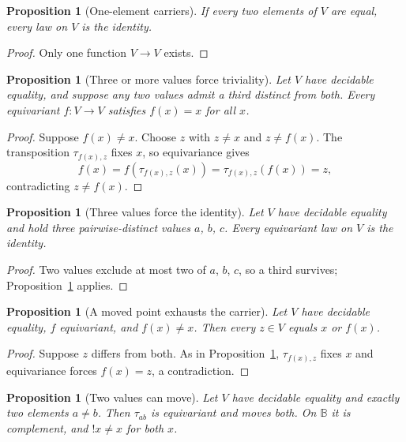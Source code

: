 \documentclass[11pt]{article}
\newtheorem{proposition}[theorem]{Proposition}
\newcommand{\B}{\mathbb{B}}
\begin{document}
\begin{proposition}[One-element carriers]
\label{prop:one}
If every two elements of $V$ are equal, every law on $V$ is the identity.
\end{proposition}

\begin{proof}
Only one function $V \to V$ exists.
\end{proof}

\begin{proposition}[Three or more values force triviality]
\label{prop:three}
Let $V$ have decidable equality, and suppose any two values admit a third distinct from both. Every equivariant $f : V \to V$ satisfies $f(x) = x$ for all $x$.
\end{proposition}

\begin{proof}
Suppose $f(x) \neq x$. Choose $z$ with $z \neq x$ and $z \neq f(x)$. The transposition $\tau_{f(x),z}$ fixes $x$, so equivariance gives
\[
f(x) = f(\tau_{f(x),z}(x)) = \tau_{f(x),z}(f(x)) = z,
\]
contradicting $z \neq f(x)$.
\end{proof}

\begin{proposition}[Three values force the identity]
\label{prop:threestill}
Let $V$ have decidable equality and hold three pairwise-distinct values $a$, $b$, $c$. Every equivariant law on $V$ is the identity.
\end{proposition}

\begin{proof}
Two values exclude at most two of $a$, $b$, $c$, so a third survives; Proposition~\ref{prop:three} applies.
\end{proof}

\begin{proposition}[A moved point exhausts the carrier]
\label{prop:twoatmost}
Let $V$ have decidable equality, $f$ equivariant, and $f(x) \neq x$. Then every $z \in V$ equals $x$ or $f(x)$.
\end{proposition}

\begin{proof}
Suppose $z$ differs from both. As in Proposition~\ref{prop:three}, $\tau_{f(x),z}$ fixes $x$ and equivariance forces $f(x) = z$, a contradiction.
\end{proof}

\begin{proposition}[Two values can move]
\label{prop:two}
Let $V$ have decidable equality and exactly two elements $a \neq b$. Then $\tau_{ab}$ is equivariant and moves both. On $\B$ it is complement, and $!x \neq x$ for both $x$.
\end{proposition}
\end{document}
